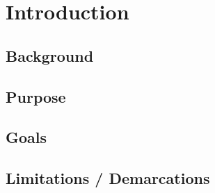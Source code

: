 \chapter{Introduction}

\section{Background}

\section{Purpose}

\section{Goals}

\section{Limitations / Demarcations}

